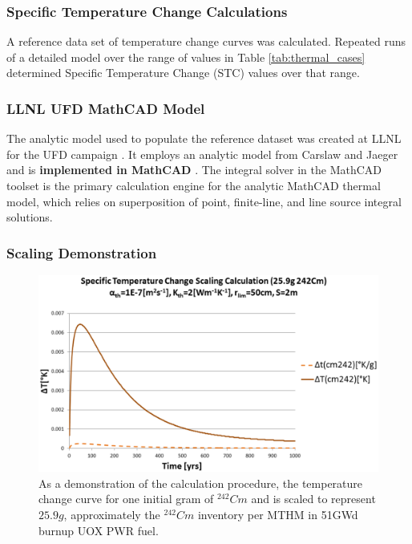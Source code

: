 \begin{frame}[ctb!]
\frametitle{Specific Temperature Change Calculations}
\footnotesize{A reference data set of temperature change curves was calculated. 
Repeated runs of a detailed model over the range of values in Table 
\ref{tab:thermal_cases} determined Specific Temperature Change (STC) values 
over that range.


}
\end{frame}


\begin{frame}[ctb!]
\frametitle{LLNL UFD MathCAD Model}
\footnotesize{
The analytic model used to populate the reference dataset was created at 
LLNL for the UFD campaign \cite{hardin_generic_2011, 
greenberg_investigations_2012, greenberg_application_2012}. It employs an 
analytic model from Carslaw and Jaeger and is \textbf{implemented in MathCAD}
\cite{carslaw_conduction_1959, ptc_mathcad_2010}.  The integral solver in the 
MathCAD toolset is the primary calculation engine for the analytic MathCAD 
thermal model, which relies on superposition of point, finite-line, and line 
source integral solutions.  
}
\end{frame}


\begin{frame}[ctb!]
\frametitle{Scaling Demonstration}
\footnotesize{

\begin{figure}[h!]
\begin{center}
\includegraphics[width=\linewidth]{./images/CmScaling.eps}
\end{center}
\caption{As a demonstration of the calculation procedure, the temperature change 
  curve for one initial gram of $^{242}Cm$ and is scaled to represent $25.9g$, 
  approximately the $^{242}Cm$ inventory per MTHM in 51GWd burnup UOX PWR fuel. }
\label{fig:CmScaling}
\end{figure}
}
\end{frame}

